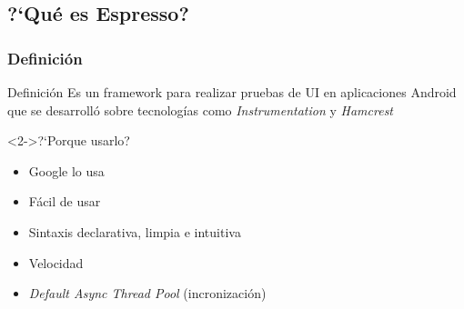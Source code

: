 \documentclass[pdf]
{beamer}
\begin{document}
    \subsection{?`Qu\'e es Espresso?}
   
    \subsubsection{Definici\'on}
    \begin{frame}{Definici\'on}
	Es un framework para realizar pruebas de UI en aplicaciones Android que se desarroll\'o sobre tecnolog\'ias como \textit{Instrumentation} y \textit{Hamcrest}
	
	\begin{block}<2->{?`Porque usarlo?}
	
	  \begin{itemize}
	    \item <3-> Google lo usa
	    \item <4-> F\'acil de usar
	    \item <5-> Sintaxis declarativa, limpia e intuitiva
	    \item <6-> Velocidad
	    \item <7-> \textit{Default Async Thread Pool} (incronizaci\'on)
	  \end{itemize}
	  
	\end{block}

    \end{frame}
\end{document}
